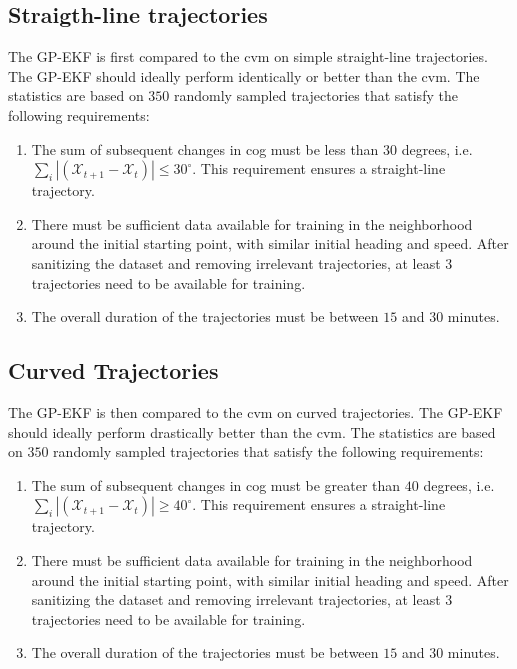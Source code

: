 \subsection{Straigth-line trajectories}
The GP-EKF is first compared to the \acrshort{cvm} on simple straight-line trajectories. The GP-EKF should ideally perform identically or better than the \acrshort{cvm}.
The statistics are based on $350$ randomly sampled trajectories that satisfy the following requirements:
\begin{enumerate}
    \item The sum of subsequent changes in \acrshort{cog} must be less than $30$ degrees, i.e. $\sum_i |(\mathcal{X}_{t+1} - \mathcal{X}_t)| \leq 30^\circ$. This requirement ensures a straight-line trajectory.
    \item There must be sufficient data available for training in the neighborhood around the initial starting point, with similar initial heading and speed. After sanitizing the dataset and removing irrelevant trajectories, at least $3$ trajectories need to be available for training. 
    \item The overall duration of the trajectories must be between $15$ and $30$ minutes. 
\end{enumerate}




\subsection{Curved Trajectories}
The GP-EKF is then compared to the \acrshort{cvm} on curved trajectories. The GP-EKF should ideally perform drastically better than the \acrshort{cvm}.
The statistics are based on $350$ randomly sampled trajectories that satisfy the following requirements:
\begin{enumerate}
    \item The sum of subsequent changes in \acrshort{cog} must be greater than $40$ degrees, i.e. $\sum_i |(\mathcal{X}_{t+1} - \mathcal{X}_t)| \geq 40^\circ$. This requirement ensures a straight-line trajectory.
    \item There must be sufficient data available for training in the neighborhood around the initial starting point, with similar initial heading and speed. After sanitizing the dataset and removing irrelevant trajectories, at least $3$ trajectories need to be available for training. 
    \item The overall duration of the trajectories must be between $15$ and $30$ minutes. 
\end{enumerate}

